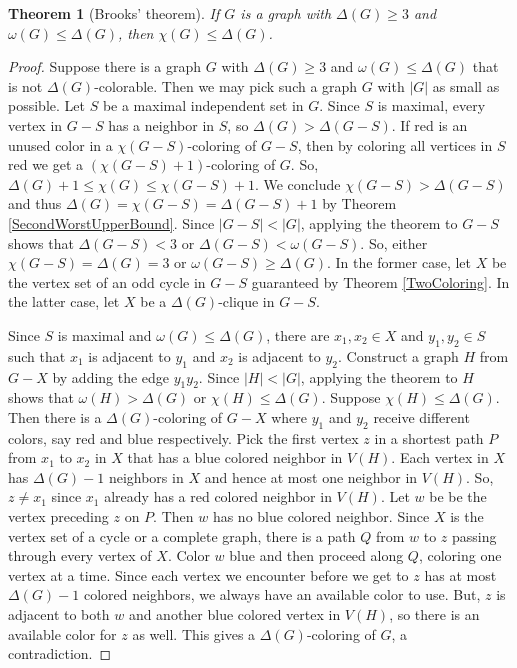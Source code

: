 \documentclass{amsbook}
\theoremstyle{plain}
\newtheorem{theorem}{Theorem}
\numberwithin{equation}{chapter}
\newcommand{\card}[1]{\left|#1\right|}
\newcommand{\parens}[1]{\left( #1 \right)}
\begin{document}
\begin{theorem}[Brooks' theorem]
If $G$ is a graph with $\Delta(G) \ge 3$ and $\omega(G) \le \Delta(G)$, then $\chi(G) \le \Delta(G)$.
\label{BrooksTheorem}
\end{theorem}
\begin{proof}
Suppose there is a graph $G$  with $\Delta(G) \ge 3$ and $\omega(G) \le \Delta(G)$ that is not $\Delta(G)$-colorable.  
Then we may pick such a graph $G$ with $\card{G}$ as small as possible.  Let $S$ be 
a maximal independent set in $G$.  Since $S$ is maximal, every vertex in $G-S$ has a neighbor in $S$, so $\Delta(G) > \Delta(G-S)$.
If red is an unused color in a $\chi(G-S)$-coloring of $G-S$, then by coloring all vertices in $S$ red we get a $\parens{\chi(G-S)+1}$-coloring of $G$.  
So, $\Delta(G) + 1 \le \chi(G) \le \chi(G-S) + 1$. We conclude $\chi(G-S) > \Delta(G - S)$ and thus $\Delta(G) = \chi(G-S) = \Delta(G-S) + 1$ by Theorem \ref{SecondWorstUpperBound}.
Since $\card{G-S} < \card{G}$, applying the theorem to $G-S$ shows that $\Delta(G-S) < 3$ or $\Delta(G -S) < \omega(G - S)$.  
So, either $\chi(G-S) = \Delta(G) = 3$ or $\omega(G-S) \ge \Delta(G)$.  In the former case, let $X$ be the vertex set of an odd cycle in $G-S$ guaranteed by Theorem \ref{TwoColoring}.  
In the latter case, let $X$ be a $\Delta(G)$-clique in $G-S$.

Since $S$ is maximal and $\omega(G) \le \Delta(G)$, there are $x_1, x_2 \in X$ and $y_1, y_2 \in S$ such that $x_1$ is adjacent to $y_1$ and $x_2$ is adjacent to $y_2$.
Construct a graph $H$ from $G-X$ by adding the edge $y_1y_2$.  Since $\card{H} < \card{G}$, applying the theorem to $H$ shows that $\omega(H) > \Delta(G)$ or $\chi(H) \le \Delta(G)$.
Suppose $\chi(H) \le \Delta(G)$.  Then there is a $\Delta(G)$-coloring of $G-X$ where $y_1$ and $y_2$ receive different colors, say red and blue respectively.
Pick the first vertex $z$ in a shortest path $P$ from $x_1$ to $x_2$ in $X$ that has a blue colored neighbor in $V(H)$. 
Each vertex in $X$ has $\Delta(G)-1$ neighbors in $X$ and hence at most one neighbor in $V(H)$.  So, $z \ne x_1$ since $x_1$ already has a red colored neighbor in $V(H)$.
Let $w$ be be the vertex preceding $z$ on $P$. Then $w$ has no blue colored neighbor.  Since $X$ is the vertex set of a cycle or a 
complete graph, there is a path $Q$ from $w$ to $z$ passing through every vertex of $X$.  Color $w$ blue and then proceed along $Q$, coloring one vertex at a time.  
Since each vertex we encounter before we get to $z$ has at most $\Delta(G) - 1$ colored neighbors, we always have an available color to use.  But, $z$ is adjacent
to both $w$ and another blue colored vertex in $V(H)$, so there is an available color for $z$ as well.  This gives a $\Delta(G)$-coloring of $G$, a contradiction.


\end{proof}
\end{document}
